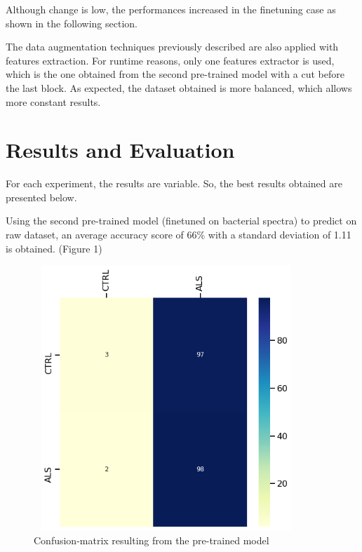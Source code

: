 Although change is low, the performances increased in the finetuning case as shown in the following section.

The data augmentation techniques previously described are also applied with features extraction. For runtime reasons, only one features extractor is used, which is the one obtained from the second pre-trained model with a cut before the last block.
As expected, the dataset obtained is more balanced, which allows more constant results.

\section{Results and Evaluation}

For each experiment, the results are variable. So, the best results obtained are presented below.

Using the second pre-trained model (finetuned on bacterial spectra) to predict on raw dataset, an average accuracy score of 66\% with a standard deviation of 1.11 is obtained. (Figure 1)
\begin{figure}[H]
\centering
\caption{Confusion-matrix resulting from the pre-trained model}
\includegraphics[width=10cm, height=10cm]{raw_model_results}
\end{figure}

